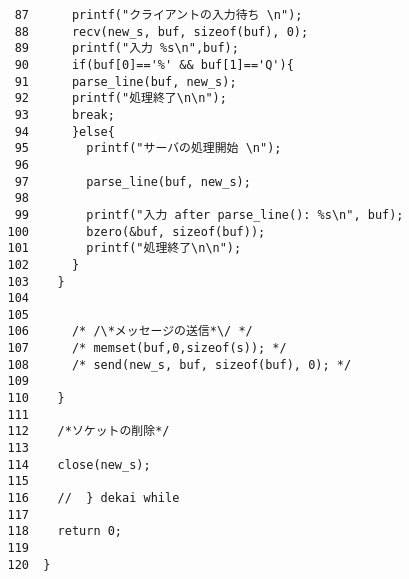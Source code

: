 \documentclass[a4j]{jarticle}
\begin{document}
\begin{verbatim}
    87	    printf("クライアントの入力待ち \n");
    88	    recv(new_s, buf, sizeof(buf), 0);
    89	    printf("入力 %s\n",buf);
    90	    if(buf[0]=='%' && buf[1]=='Q'){
    91	    parse_line(buf, new_s);
    92	    printf("処理終了\n\n");
    93	    break;
    94	    }else{
    95	      printf("サーバの処理開始 \n");
    96	
    97	      parse_line(buf, new_s);
    98	
    99	      printf("入力 after parse_line(): %s\n", buf);
   100	      bzero(&buf, sizeof(buf));
   101	      printf("処理終了\n\n");
   102	    }
   103	  }
   104	
   105	
   106	    /* /\*メッセージの送信*\/ */
   107	    /* memset(buf,0,sizeof(s)); */
   108	    /* send(new_s, buf, sizeof(buf), 0); */
   109	
   110	  }
   111	
   112	  /*ソケットの削除*/
   113	
   114	  close(new_s);
   115	
   116	  //  } dekai while
   117	
   118	  return 0;
   119	
   120	}
\end{verbatim}
\end{document}
